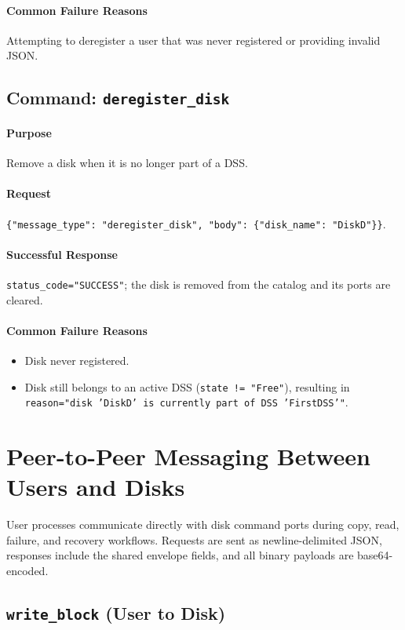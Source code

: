 \documentclass[11pt]{article}
\begin{document}
\paragraph{Common Failure Reasons} Attempting to deregister a user that was never registered or providing invalid JSON.

\subsection{Command: \texttt{deregister\_disk}}
\paragraph{Purpose} Remove a disk when it is no longer part of a DSS.

\paragraph{Request} \texttt{\{"message\_type": "deregister\_disk", "body": \{"disk\_name": "DiskD"\}\}}.

\paragraph{Successful Response} \texttt{status\_code="SUCCESS"}; the disk is removed from the catalog and its ports are cleared.

\paragraph{Common Failure Reasons}
\begin{itemize}
  \item Disk never registered.
  \item Disk still belongs to an active DSS (\texttt{state != "Free"}), resulting in \texttt{reason="disk 'DiskD' is currently part of DSS 'FirstDSS'"}.
\end{itemize}

\clearpage
\section{Peer-to-Peer Messaging Between Users and Disks}
User processes communicate directly with disk command ports during copy, read, failure, and recovery workflows. Requests are sent as newline-delimited JSON, responses include the shared envelope fields, and all binary payloads are base64-encoded.

\subsection{\texttt{write\_block} (User to Disk)}
\end{document}
